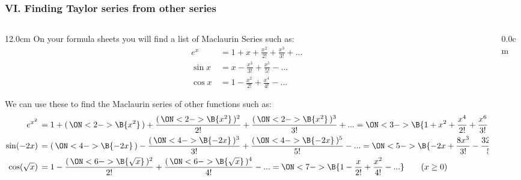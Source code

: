 \begin{frame}
\frametitle{VI. Finding Taylor series from other series }
\scriptsize
\begin{columns}
\begin{column}{12.0cm}
	On your formula sheets you will find a list of Maclaurin Series such as:
	\begin{align*}
		e^x &\,= 1 + x + \frac{x^2}{2!} + \frac{x^3}{3!} + ... \\
		\sin x &\,= x - \frac{x^3}{3!} + \frac{x^5}{5!} - ... \\
		\cos x &\,= 1 - \frac{x^2}{2!} + \frac{x^4}{4!} - ... 
	\end{align*}
	
	\vspace{0.4cm}
	
	We can use these to find the Maclaurin series of other functions such as:
	\begin{align*}
		e^{x^2} &\,= 1 + (\,\ON<2->{\B{x^2}}\,) + \frac{(\,\ON<2->{\B{x^2}}\,)^2}{2!} + \frac{(\,\ON<2->{\B{x^2}}\,)^3}{3!} + ... = \ON<3->{\B{ 1 + x^2 + \frac{x^4}{2!} + \frac{x^6}{3!} + ... }}\\
		\sin (-2x) &\,= (\,\ON<4->{\B{-2x}}\,) - \frac{(\,\ON<4->{\B{-2x}}\,)^3}{3!} + \frac{(\,\ON<4->{\B{-2x}}\,)^5}{5!} - ... = \ON<5->{\B{ -2x + \frac{8x^3}{3!} - \frac{32x^5}{5!} - ...}} \\
		\cos (\sqrt{x}) &\,= 1 - \frac{(\,\ON<6->{\B{\sqrt{x}}}\,)^2}{2!} + \frac{(\,\ON<6->{\B{\sqrt{x}}}\,)^4}{4!} - ... = \ON<7->{\B{ 1 - \frac{x}{2!} + \frac{x^2}{4!} - ...}} \qquad (x\ge0)\\
	\end{align*}
\end{column}
\begin{column}{0.0cm}\end{column}
\end{columns}
\end{frame}

